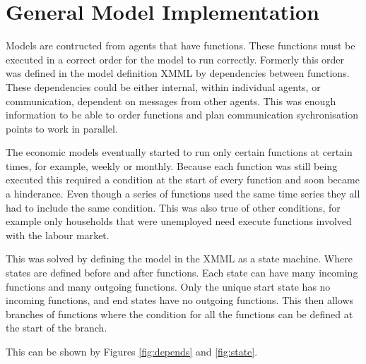 \section{General Model Implementation}


Models are contructed from agents that have functions. These functions must be
executed in a correct order for the model to run correctly. Formerly this order
was defined in the model definition XMML by dependencies between functions. These
dependencies could be either internal, within individual agents, or
communication, dependent on messages from other agents. This was enough
information to be able to order functions and plan communication sychronisation
points to work in parallel.

The economic models eventually started to run only certain functions at
certain times, for example, weekly or monthly. Because each function
was still being executed this required a condition at the start of every
function and soon became a hinderance. Even though a series of functions used
the same time series they all had to include the same condition. This was also
true of other conditions, for example only households that were unemployed need
execute functions involved with the labour market.

This was solved by defining the model in the XMML as a state machine. Where
states are defined before and after functions.
Each state can have many incoming functions and many outgoing functions.
Only the unique start state has no incoming functions, and end states have no
outgoing functions. This then allows branches of functions where the condition
for all the functions can be defined at the start of the branch.

This can be shown by Figures \ref{fig:depends} and \ref{fig:state}.

